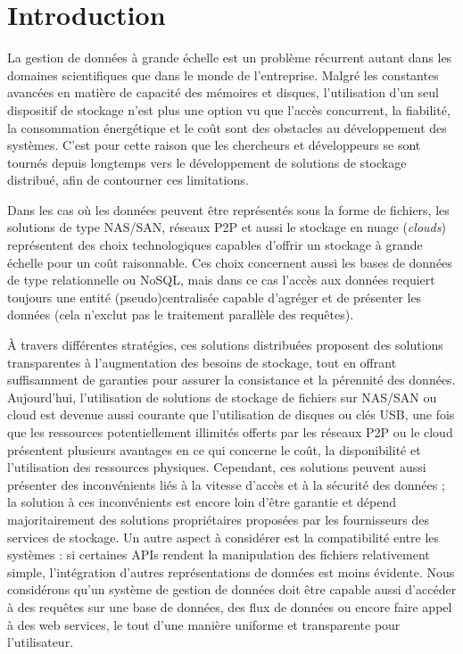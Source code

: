 \begin{resume}

\end{resume}

\section{Introduction}

La gestion de données à grande échelle est un problème récurrent autant dans les domaines scientifiques que dans le monde de l'entreprise. Malgré les constantes avancées en matière de capacité des mémoires et disques, l'utilisation d'un seul dispositif de stockage n'est plus une option vu que l'accès concurrent, la fiabilité, la consommation énergétique et le coût sont des obstacles au développement des systèmes. C'est pour cette raison que les chercheurs et développeurs se sont tournés depuis longtemps vers le développement de solutions de stockage distribué, afin de contourner ces limitations.

Dans les cas où les données peuvent être représentés sous la forme de fichiers, les solutions de type NAS/SAN, réseaux P2P et aussi le stockage en nuage (\textit{clouds}) représentent des choix technologiques capables d'offrir un stockage à grande échelle pour un coût raisonnable. Ces choix concernent aussi les bases de données de type relationnelle ou NoSQL, mais dans ce cas l'accès aux données requiert toujours une entité (pseudo)centralisée capable d'agréger et de présenter les données (cela n'exclut pas le traitement parallèle des requêtes). 

À travers différentes stratégies, ces solutions distribuées proposent des solutions transparentes à l'augmentation des besoins de stockage, tout en offrant suffisamment de garanties pour assurer la consistance et la pérennité des données. Aujourd'hui, l'utilisation de solutions de stockage de fichiers sur NAS/SAN ou cloud est devenue aussi courante que l'utilisation de disques ou clés USB, une fois que les ressources potentiellement illimités offerts par les réseaux P2P ou le cloud présentent plusieurs avantages en ce qui concerne le coût, la disponibilité et l'utilisation des ressources physiques. Cependant, ces solutions peuvent aussi présenter des inconvénients liés à la vitesse d'accès et à la sécurité des données ; la solution à ces inconvénients est encore loin d'être garantie et dépend majoritairement des solutions propriétaires proposées par les fournisseurs des services de stockage. Un autre aspect à considérer est la compatibilité entre les systèmes : si certaines APIs rendent la manipulation des fichiers relativement simple, l'intégration d'autres représentations de données est moins évidente. Nous considérons qu'un système de gestion de données doit être capable aussi d'accéder à des requêtes sur une base de données, des flux de données ou encore faire appel à des web services, le tout d'une manière uniforme et transparente pour l'utilisateur.

